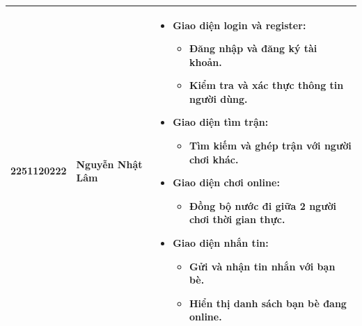 \documentclass[a4paper,12pt]{article}
\begin{document}
\begin{center}
\begin{tabular}{| C{2cm} | C{3cm} | m{8cm} |}
  2251120222
  & Nguyễn Nhật Lâm
  &
  \begin{itemize}[leftmargin=*,itemsep=0pt,parsep=0pt]
    \item \textbf{Giao diện login và register:}
      \begin{itemize}[leftmargin=1em,itemsep=0pt]
        \item Đăng nhập và đăng ký tài khoản.
        \item Kiểm tra và xác thực thông tin người dùng.
      \end{itemize}
    \item \textbf{Giao diện tìm trận:}
      \begin{itemize}[leftmargin=1em,itemsep=0pt]
        \item Tìm kiếm và ghép trận với người chơi khác.
      \end{itemize}
    \item \textbf{Giao diện chơi online:}
      \begin{itemize}[leftmargin=1em,itemsep=0pt]
        \item Đồng bộ nước đi giữa 2 người chơi thời gian thực.
      \end{itemize}
    \item \textbf{Giao diện nhắn tin:}
      \begin{itemize}[leftmargin=1em,itemsep=0pt]
        \item Gửi và nhận tin nhắn với bạn bè.
        \item Hiển thị danh sách bạn bè đang online.
      \end{itemize}
  \end{itemize}
  \\
  \hline


\end{tabular}
\end{center}
\end{document}
